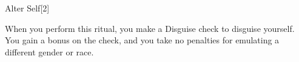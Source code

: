 \begin{spellsection}{Alter Self}[2]
    \begin{spellheader}
    \end{spellheader}
    \begin{spellcontent}
        \begin{spelltargetinginfo}
        \end{spelltargetinginfo}
        \begin{spelleffects}
            \spelleffect When you perform this ritual, you make a Disguise check to disguise yourself. You gain a  bonus on the check, and you take no penalties for emulating a different gender or race.
            \spelldur \durext
        \end{spelleffects}
    \end{spellcontent}
    \begin{spellfooter}
    \end{spellfooter}
    \begin{spellaugments}
    \end{spellaugments}
\end{spellsection}

